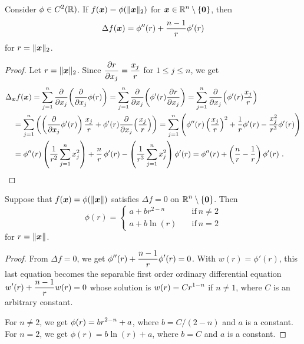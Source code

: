 \begin{prop} \label{laplace_spheric}
Consider $\displaystyle \phi \in C^2(\mathbb{R})$.
If $f({\bm{x}}) = \phi(\|{\bm{x}}\|_2)$ for
$\displaystyle {\bm{x}}\in \mathbb{R}^n\setminus \{{\bm{0}}\}$, then
\[
\Delta f({\bm{x}}) = \phi''(r) + \frac{n-1}{r} \phi'(r)
\]
for $r = \|{\bm{x}}\|_2$.
\end{prop}

\begin{proof}
Let $r = \|{\bm{x}}\|_2$.  Since
$\displaystyle \frac{\partial{r}}{\partial x_j} = \frac{x_j}{r}$ for $1 \leq j \leq n$, we get
\begin{align*}
&\Delta_{\VEC{x}} f(\VEC{x})
= \sum_{j=1}^n \pdfdx{\left(\pdfdx{\phi(r)}{x_j}\right)}{x_j}
= \sum_{j=1}^n \pdfdx{\left(\phi'(r)\pdydx{r}{x_j}\right)}{x_j}
= \sum_{j=1}^n \pdfdx{\left(\phi'(r) \frac{x_j}{r} \right)}{x_j} \\
&\quad = \sum_{j=1}^n \left( \left(\pdfdx{\phi'(r)}{x_j}\right) \frac{x_j}{r}
+ \phi'(r) \pdfdx{\left(\frac{x_j}{r}\right)}{x_j}\right)
= \sum_{j=1}^n \left(
\phi''(r) \left(\frac{x_j}{r}\right)^2 + \frac{1}{r} \phi'(r) -
\frac{x_j^2}{r^3}\phi'(r) \right) \\
&\quad = \phi''(r)\left( \frac{1}{r^2}\sum_{j=1}^n x_j^2\right)
+ \frac{n}{r}\, \phi'(r) - \left(\frac{1}{r^3}\sum_{j=1}^n x_j^2\right) \phi'(r)
= \phi''(r) + \left(\frac{n}{r} - \frac{1}{r}\right) \phi'(r) \ .  \qedhere
\end{align*}
\end{proof}

\begin{cor} \label{laplace_sharm}
Suppose that $f({\bm{x}}) = \phi(\|{\bm{x}}\|)$ satisfies
$\Delta f = 0$ on $\displaystyle \mathbb{R}^n \setminus \{{\bm{0}}\}$.  Then
\[
\phi(r) =
\begin{cases}
a + b r^{2-n} & \quad \text{if} \ n \neq 2 \\
a+b \ln(r) & \quad \text{if} \ n=2
\end{cases}
\]
for $r = \|{\bm{x}}\|$.
\end{cor}

\begin{proof}
From $\Delta f = 0$, we get
$\displaystyle \phi''(r) + \frac{n-1}{r} \phi'(r) = 0$.
With $w(r) = \phi'(r)$, this last equation becomes the separable first
order ordinary differential equation
$\displaystyle w'(r) + \frac{n-1}{r} w(r) = 0$
whose solution is $\displaystyle w(r) = C r^{1-n}$ if $n\neq 1$, where $C$
is an arbitrary constant.

For $n\neq 2$, we get $\displaystyle \phi(r) = b r^{2-n} + a$,
where $b=C/(2-n)$ and $a$ is a constant.  For $n=2$, we get
$\phi(r) = b\ln(r) + a$, where $b=C$ and $a$ is a constant.
\end{proof}


